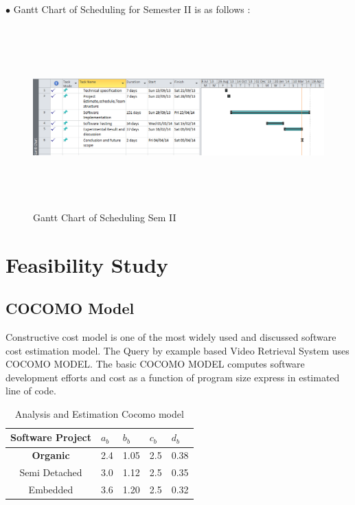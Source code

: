 \newpage
$ \bullet $ Gantt Chart of Scheduling for Semester II is as follows : \\
\begin{figure}[h]
\centering
  \includegraphics[width=14cm,height=7cm]{fig34-1.png}
  \caption{Gantt Chart of Scheduling Sem II}\label{Gantt Chart of Scheduling Sem II}
\end{figure}

\section{Feasibility Study}
\subsection{COCOMO Model}
Constructive cost model is one of the most widely used and discussed software cost estimation model. The Query by example based Video Retrieval System uses COCOMO MODEL. The basic COCOMO MODEL computes software development efforts and cost as a function of program size express in estimated line of code.

\begin{table}[h]
\begin{flushleft}
\centering
\caption{Analysis and Estimation Cocomo model} \label{Analysis and Estimation Cocomo model}
\begin{tabular}{|c|p{2cm}|p{2cm}|p{2cm}|p{2cm}|} \hline
Software Project & $a_{b}$ & $b_{b}$ & $c_{b}$ & $d_{b}$ \\ \hline
 \textbf{Organic} & 2.4 & 1.05 & 2.5 & 0.38 \\ \hline
 Semi Detached & 3.0 & 1.12 & 2.5 & 0.35 \\ \hline
 Embedded & 3.6 & 1.20 & 2.5 & 0.32 \\ \hline
 \end{tabular}
 \end{flushleft}
 \end{table}

